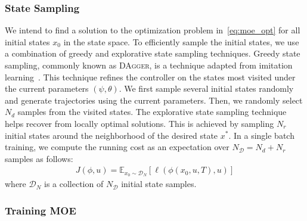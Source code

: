 \subsubsection{State Sampling}
\label{sssec:state_sampling}

We intend to find a solution to the optimization problem
in~\eqref{eq:moe_opt} for all initial states $x_0$ in the
state space.
%
To efficiently sample the initial states, we use a combination of greedy and
explorative state sampling techniques.
%
Greedy state sampling, commonly known as \textsc{DAgger}, is a technique
adapted from imitation learning~\cite{ross2011no}.
%
This technique refines the controller on the states most visited under the
current parameters $(\psi, \theta)$.
%
We first sample several initial states randomly and generate trajectories using
the current parameters.
%
Then, we randomly select $N_d$ samples from the visited states. 
%
The explorative state sampling technique helps recover from locally optimal
solutions. 
%
This is achieved by sampling $N_r$ initial states around the neighborhood of the
desired state $x^*$.
%
In a single batch training, we compute the running cost as an expectation
over $N_{\mathcal{D}} = N_d+N_r$ samples as follows:
\begin{align*}
    J(\phi, u) = \mathbb{E}_{x_0 \sim \mathcal{D}_N}[ \ell(\phi(x_0, u, T), u)]
\end{align*}
\noindent where $\mathcal{D}_N$ is a collection of $N_{\mathcal{D}}$ initial state samples.

\subsubsection{Training MOE}
\label{sssec:training_moe}

